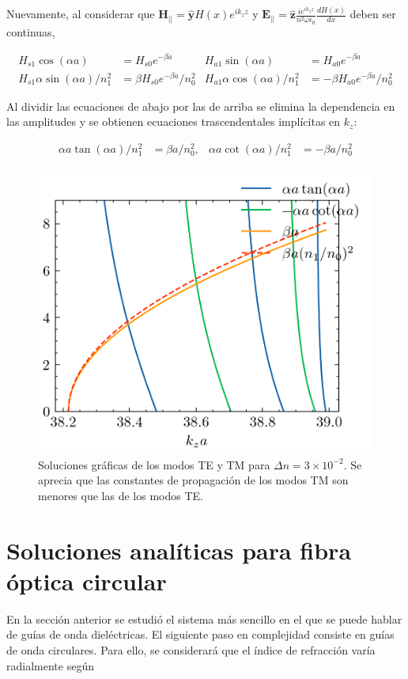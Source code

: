 Nuevamente, al considerar que $\textbf{H}_{||}= \mathbf{\hat{y}} H(x)e^{i k_z z }$ y $\textbf{E}_{||} = \mathbf{\hat{z}} \frac{ie^{i k_z z }}{n^2 \omega \epsilon_0} \frac{d H(x)}{dx}$ deben ser continuas, 

\begin{align*}
H_{s1}\cos(\alpha a) &= H_{s0} e^{-\beta a} & H_{a1}\sin(\alpha a) &= H_{a0} e^{-\beta a}
\\
H_{s1}\alpha\sin(\alpha a)/n_1^2 &= \beta H_{s0} e^{-\beta a}/n_0^2 & H_{a1}\alpha\cos(\alpha a)/n_1^2 &= -\beta H_{a0} e^{-\beta a}/n_0^2
\end{align*}

Al dividir las ecuaciones de abajo por las de arriba se elimina la dependencia en las amplitudes y se obtienen ecuaciones trascendentales implícitas en $k_z$:

\begin{align}
	\alpha a \tan(\alpha a)/n_1^2 &= \beta a/n_0^2, & \alpha a \cot(\alpha a)/n_1^2 &= -\beta a/n_0^2 \label{eqn:trascendentalTM}
\end{align}


\begin{figure}[H]
	\centering
	\includegraphics[width=0.7\linewidth]{media/slabgraphicalTETM1}
	\caption[Soluciones gráficas de los modos TE y TM]{Soluciones gráficas de los modos TE y TM para $\Delta n = 3\times 10^{-2}$. Se aprecia que las constantes de propagación de los modos TM son menores que las de los modos TE.}
\end{figure}
\section{Soluciones analíticas para fibra óptica circular}
En la sección anterior se estudió el sistema más sencillo en el que se puede hablar de guías de onda dieléctricas. El siguiente paso en complejidad consiste en guías de onda circulares. Para ello, se considerará que el índice de refracción varía radialmente según 

